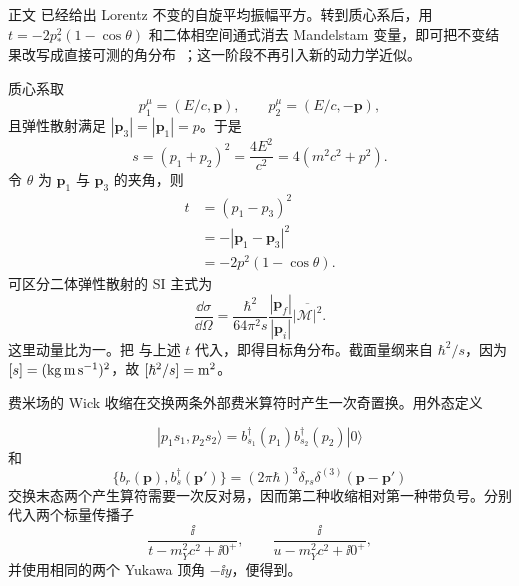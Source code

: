 \begin{derivation}

正文 已经给出 Lorentz 不变的自旋平均振幅平方。转到质心系后，用 $t=-2p_*^2(1-\cos\theta)$ 和二体相空间通式消去 Mandelstam 变量，即可把不变结果改写成直接可测的角分布~；这一阶段不再引入新的动力学近似。

质心系取
\begin{equation*}
 p_1^\mu=(E/c,\mathbf p),\qquad
 p_2^\mu=(E/c,-\mathbf p),
\end{equation*}
且弹性散射满足 $|\mathbf p_3|=|\mathbf p_1|=p$。于是
\begin{equation*}
 s=(p_1+p_2)^2=\frac{4E^2}{c^2}=4(m^2c^2+p^2).
\end{equation*}
令 $\theta$ 为 $\mathbf p_1$ 与 $\mathbf p_3$ 的夹角，则
\begin{align*}
 t&=(p_1-p_3)^2\\
  &=-|\mathbf p_1-\mathbf p_3|^2\\
  &=-2p^2(1-\cos\theta).
\end{align*}
可区分二体弹性散射的 SI 主式为
\begin{equation*}
 \frac{\dd\sigma}{\dd\Omega}
 =\frac{\hbar^2}{64\pi^2s}
 \frac{|\mathbf p_f|}{|\mathbf p_i|}
 \overline{|\mathcal M|^2}.
\end{equation*}
这里动量比为一。把 与上述 $t$ 代入，即得目标角分布。截面量纲来自 $\hbar^2/s$，因为 $[s]=({\rm kg\,m\,s^{-1}})^2$，故 $[\hbar^2/s]={\rm m^2}$。
\end{derivation}

\begin{derivation}
费米场的 Wick 收缩在交换两条外部费米算符时产生一次奇置换。用外态定义

\begin{equation*}
 |p_1s_1,p_2s_2\rangle
 =b_{s_1}^\dagger(p_1)b_{s_2}^\dagger(p_2)|0\rangle
\end{equation*}
和
\begin{equation*}
 \{b_r(\mathbf p),b_s^\dagger(\mathbf p')\}
 =(2\pi\hbar)^3\delta_{rs}\delta^{(3)}(\mathbf p-\mathbf p')
\end{equation*}
交换末态两个产生算符需要一次反对易，因而第二种收缩相对第一种带负号。分别代入两个标量传播子
\begin{equation*}
 \frac{\ii}{t-m_Y^2c^2+\ii0^+},
 \qquad
 \frac{\ii}{u-m_Y^2c^2+\ii0^+},
\end{equation*}
并使用相同的两个 Yukawa 顶角 $-\ii y$，便得到。
\end{derivation}

